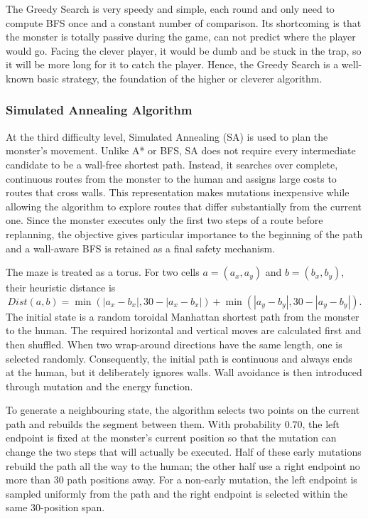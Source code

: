 \documentclass[12pt,a4paper]{article}
\begin{document}
The Greedy Search is very speedy and simple, each round and only need to compute BFS once and a constant number of comparison. Its shortcoming is that the monster is totally passive during the game, can not predict where the player would go. Facing the clever player, it would be dumb and be stuck in the trap, so it will be more long for it to catch the player. Hence, the Greedy Search is a well-known basic strategy, the foundation of the higher or cleverer algorithm.

\subsubsection{Simulated Annealing Algorithm}

At the third difficulty level, Simulated Annealing (SA) is used to plan the
monster's movement. Unlike A* or BFS, SA does not require every intermediate
candidate to be a wall-free shortest path. Instead, it searches over complete,
continuous routes from the monster to the human and assigns large costs to
routes that cross walls. This representation makes mutations inexpensive while
allowing the algorithm to explore routes that differ substantially from the
current one. Since the monster executes only the first two steps of a route
before replanning, the objective gives particular importance to the beginning
of the path and a wall-aware BFS is retained as a final safety mechanism.

The maze is treated as a torus. For two cells $a=(a_x,a_y)$ and
$b=(b_x,b_y)$, their heuristic distance is
\[
Dist(a,b)=
\min(|a_x-b_x|,30-|a_x-b_x|)
+\min(|a_y-b_y|,30-|a_y-b_y|).
\]
The initial state is a random toroidal Manhattan shortest path from the monster
to the human. The required horizontal and vertical moves are calculated first
and then shuffled. When two wrap-around directions have the same length, one is
selected randomly. Consequently, the initial path is continuous and always
ends at the human, but it deliberately ignores walls. Wall avoidance is then
introduced through mutation and the energy function.

To generate a neighbouring state, the algorithm selects two points on the
current path and rebuilds the segment between them. With probability $0.70$,
the left endpoint is fixed at the monster's current position so that the
mutation can change the two steps that will actually be executed. Half of these
early mutations rebuild the path all the way to the human; the other half use a
right endpoint no more than 30 path positions away. For a non-early mutation,
the left endpoint is sampled uniformly from the path and the right endpoint is
selected within the same 30-position span.
\end{document}
